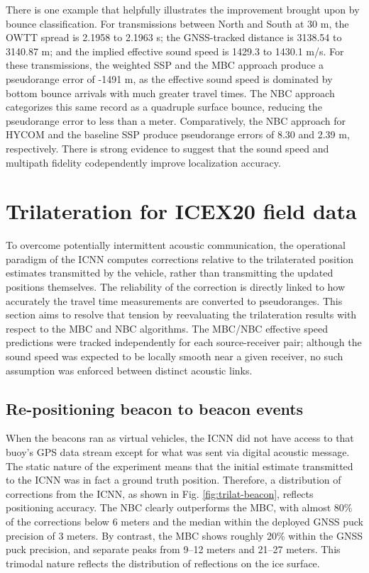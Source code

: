 There is one example that helpfully illustrates the improvement brought upon by bounce classification.
For transmissions between North and South at 30 m, the OWTT spread is 2.1958 to 2.1963 s; the GNSS-tracked distance is 3138.54 to 3140.87 m; and the implied effective sound speed is 1429.3 to 1430.1 m/s.
For these transmissions, the weighted SSP and the MBC approach produce a pseudorange error of -1491 m, as the effective sound speed is dominated by bottom bounce arrivals with much greater travel times.
The NBC approach categorizes this same record as a quadruple surface bounce, reducing the pseudorange error to less than a meter.
Comparatively, the NBC approach for HYCOM and the baseline SSP produce pseudorange errors of 8.30 and 2.39 m, respectively. 
There is strong evidence to suggest that the sound speed and multipath fidelity codependently improve localization accuracy.

\clearpage
\section{Trilateration for ICEX20 field data}\label{sec:trilat}

To overcome potentially intermittent acoustic communication, the operational paradigm of the ICNN computes corrections relative to the trilaterated position estimates transmitted by the vehicle, rather than transmitting the updated positions themselves.
The reliability of the correction is directly linked to how accurately the travel time measurements are converted to pseudoranges.
This section aims to resolve that tension by reevaluating the trilateration results with respect to the MBC and NBC algorithms.
The MBC/NBC effective speed predictions were tracked independently for each source-receiver pair; although the sound speed was expected to be locally smooth near a given receiver, no such assumption was enforced between distinct acoustic links.

\subsection{Re-positioning beacon to beacon events}

When the beacons ran as virtual vehicles, the ICNN did not have access to that buoy's GPS data stream except for what was sent via digital acoustic message.
The static nature of the experiment means that the initial estimate transmitted to the ICNN was in fact a ground truth position.
Therefore, a distribution of corrections from the ICNN, as shown in Fig. \ref{fig:trilat-beacon}, reflects positioning accuracy.
The NBC clearly outperforms the MBC, with almost 80\% of the corrections below 6 meters and the median within the deployed GNSS puck precision of 3 meters.
By contrast, the MBC shows roughly 20\% within the GNSS puck precision, and separate peaks from 9--12 meters and 21--27 meters.
This trimodal nature reflects the distribution of reflections on the ice surface.

